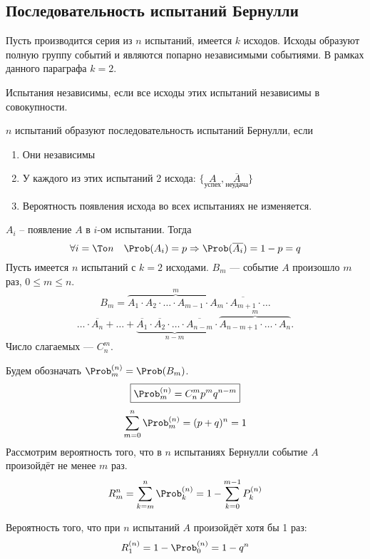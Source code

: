 \subsection{Последовательность испытаний Бернулли}
Пусть производится серия из $n$ испытаний, имеется $k$ исходов. Исходы образуют полную группу событий и являются попарно независимыми событиями. В рамках данного параграфа $k = 2$.
\begin{definition}
	Испытания независимы, если все исходы этих испытаний независимы в совокупности.
\end{definition}
\begin{definition}
	$n$ испытаний образуют последовательность испытаний Бернулли, если
	\begin{enumerate}
		\item Они независимы
		\item У каждого из этих испытаний 2 исхода: $\{\underset{\text{успех}}{A}, \underset{\text{неудача}}{\overline{A}} \}$
		\item Вероятность появления исхода во всех испытаниях не изменяется.
	\end{enumerate}
\end{definition}
$A_i$ -- появление $A$ в $i$-ом испытании. Тогда
\[ \forall i=\To n \quad \Prob(A_i) = p \Rightarrow \Prob(\overline{A_i}) = 1 - p = q \]
Пусть имеется $n$ испытаний с $k=2$ исходами. $B_m$ --- событие $A$ произошло $m$ раз, $0 \leqslant m \leqslant n$.
\[B_m = \overbrace{A_1 \cdot A_2 \cdot \ldots \cdot A_{m-1} \cdot A_m}^{m} \cdot \overline{A_{m+1}} \cdot \ldots \]
\[ \ldots \cdot \overline{A_n} + \ldots + \underbrace{\overline{A_1} \cdot \overline{A_2} \cdot \dots \cdot \overline{A_{n-m}}}_{n-m} \cdot \overbrace{A_{n-m+1} \cdot \ldots \cdot A_n}^m.\]
Число слагаемых --- $C_n^m$.

Будем обозначать $\Prob_m^{(n)} = \Prob(B_m)$.
\[
	\boxed{\Prob_m^{(n)} = C_n^m p^m q^{n-m}}
\]
\[
	\sum\limits_{m=0}^n \Prob_m^{(n)} = (p + q)^n = 1
\]
Рассмотрим вероятность того, что в $n$ испытаниях Бернулли событие $A$ произойдёт не менее $m$ раз.
\[
	R_m^{n} = \sum\limits_{k = m}^n \Prob_k^{(n)} = 1 - \sum\limits_{k=0}^{m-1} P_k^{(n)}
\]
\begin{example}
	Вероятность того, что при $n$ испытаний $A$ произойдёт хотя бы 1 раз:
	\[ R_1^{(n)} = 1 - \Prob_0^{(n)} = 1 - q^n \]
\end{example}
